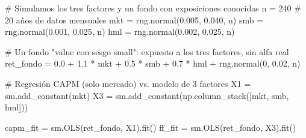 \documentclass[
  spanish,
  letterpaper,
  DIV=11,
  numbers=noendperiod]{scrreprt}
\newenvironment{Shaded}{\begin{snugshade}}{\end{snugshade}}
\newcommand{\CommentTok}[1]{\textcolor[rgb]{0.37,0.37,0.37}{#1}}
\newcommand{\DecValTok}[1]{\textcolor[rgb]{0.68,0.00,0.00}{#1}}
\newcommand{\FloatTok}[1]{\textcolor[rgb]{0.68,0.00,0.00}{#1}}
\newcommand{\NormalTok}[1]{\textcolor[rgb]{0.00,0.23,0.31}{#1}}
\newcommand{\OperatorTok}[1]{\textcolor[rgb]{0.37,0.37,0.37}{#1}}
\begin{document}
\label{fama-french}
\begin{Shaded}
\begin{Highlighting}[]
\CommentTok{\# Simulamos los tres factores y un fondo con exposiciones conocidas}
\NormalTok{n }\OperatorTok{=} \DecValTok{240}   \CommentTok{\# 20 años de datos mensuales}
\NormalTok{mkt }\OperatorTok{=}\NormalTok{ rng.normal(}\FloatTok{0.005}\NormalTok{, }\FloatTok{0.040}\NormalTok{, n)}
\NormalTok{smb }\OperatorTok{=}\NormalTok{ rng.normal(}\FloatTok{0.001}\NormalTok{, }\FloatTok{0.025}\NormalTok{, n)}
\NormalTok{hml }\OperatorTok{=}\NormalTok{ rng.normal(}\FloatTok{0.002}\NormalTok{, }\FloatTok{0.025}\NormalTok{, n)}

\CommentTok{\# Un fondo "value con sesgo small": expuesto a los tres factores, sin alfa real}
\NormalTok{ret\_fondo }\OperatorTok{=} \FloatTok{0.0} \OperatorTok{+} \FloatTok{1.1} \OperatorTok{*}\NormalTok{ mkt }\OperatorTok{+} \FloatTok{0.5} \OperatorTok{*}\NormalTok{ smb }\OperatorTok{+} \FloatTok{0.7} \OperatorTok{*}\NormalTok{ hml }\OperatorTok{+}\NormalTok{ rng.normal(}\DecValTok{0}\NormalTok{, }\FloatTok{0.02}\NormalTok{, n)}

\CommentTok{\# Regresión CAPM (solo mercado) vs. modelo de 3 factores}
\NormalTok{X1 }\OperatorTok{=}\NormalTok{ sm.add\_constant(mkt)}
\NormalTok{X3 }\OperatorTok{=}\NormalTok{ sm.add\_constant(np.column\_stack([mkt, smb, hml]))}

\NormalTok{capm\_fit }\OperatorTok{=}\NormalTok{ sm.OLS(ret\_fondo, X1).fit()}
\NormalTok{ff\_fit }\OperatorTok{=}\NormalTok{ sm.OLS(ret\_fondo, X3).fit()}


\end{Highlighting}
\end{Shaded}
\end{document}
